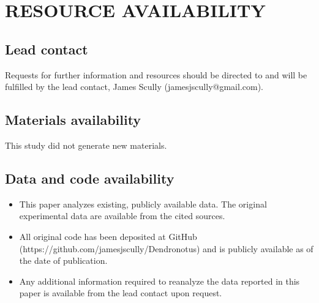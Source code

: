 \section*{RESOURCE AVAILABILITY}

\subsection*{Lead contact}

Requests for further information and resources should be directed to and will be fulfilled by the lead contact, James Scully (jamesjscully@gmail.com).

\subsection*{Materials availability}

This study did not generate new materials.

\subsection*{Data and code availability}

\begin{itemize}
    \item This paper analyzes existing, publicly available data. The original experimental data are available from the cited sources.
    \item All original code has been deposited at GitHub (https://github.com/jamesjscully/Dendronotus) and is publicly available as of the date of publication.
    \item Any additional information required to reanalyze the data reported in this paper is available from the lead contact upon request.
\end{itemize}
